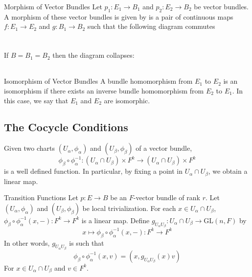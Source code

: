 \documentclass[a4paper]{article}
\begin{document}
\begin{defn}{Morphism of Vector Bundles}{} Let $p_1:E_1\to B_1$ and $p_2:E_2\to B_2$ be vector bundles. A morphism of these vector bundles is given by is a pair of continuous maps $f:E_1\to E_2$ and $g:B_1\to B_2$ such that the following diagram commutes \\~\\
 \\
If $B=B_1=B_2$  then the diagram collapses: \\~\\
\end{defn}

\begin{defn}{Isomorphism of Vector Bundles}{} A bundle homomorphism from $E_1$ to $E_2$ is an isomorphism if there exists an inverse bundle homomorphism from $E_2$ to $E_1$. In this case, we say that $E_1$ and $E_2$ are isomorphic. 
\end{defn}

\subsection{The Cocycle Conditions}
Given two charts $(U_\alpha,\phi_\alpha)$ and $(U_\beta,\phi_\beta)$ of a vector bundle, $$\phi_\beta\circ\phi_\alpha^{-1}:(U_\alpha\cap U_\beta)\times F^k\to(U_\alpha\cap U_\beta)\times F^k$$ is a well defined function. In particular, by fixing a point in $U_\alpha\cap U_\beta$, we obtain a linear map. 

\begin{defn}{Transition Functions}{} Let $p:E\to B$ be an $F$-vector bundle of rank $r$. Let $(U_\alpha,\phi_\alpha)$ and $(U_\beta,\phi_\beta)$ be local trivialization. For each $x\in U_\alpha\cap U_\beta$, $\phi_\beta\circ\phi_\alpha^{-1}(x,-):F^k\to F^k$ is a linear map. Define $g_{U_\alpha U_\beta}:U_\alpha\cap U_\beta\to\text{GL}(n,F)$ by $$x\mapsto\phi_\beta\circ\phi_\alpha^{-1}(x,-):F^k\to F^k$$ In other words, $g_{U_\alpha U_\beta}$ is such that $$\phi_\beta\circ\phi_\alpha^{-1}(x,v)=(x,g_{U_\alpha U_\beta}(x)v)$$ For $x\in U_\alpha\cap U_\beta$ and $v\in F^k$. 
\end{defn}
\end{document}
